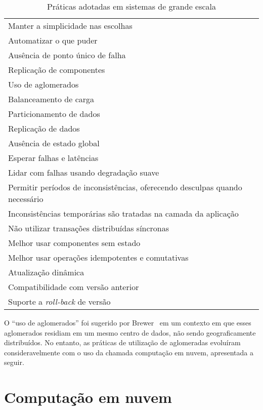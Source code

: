 \begin{table}[!t]
\begin{center}
    \begin{tabular}{l}
	 \hline
Manter a simplicidade nas escolhas \\
Automatizar o que puder \\
Ausência de ponto único de falha \\
Replicação de componentes \\
Uso de aglomerados \\
Balanceamento de carga \\
Particionamento de dados \\
Replicação de dados \\
Ausência de estado global  \\%
Esperar falhas e latências  \\
Lidar com falhas usando degradação suave \\
Permitir períodos de inconsistências, oferecendo desculpas quando necessário \\
Inconsistências temporárias são tratadas na camada da aplicação \\
Não utilizar transações distribuídas síncronas \\
Melhor usar componentes sem estado  \\%
Melhor usar operações idempotentes e comutativas \\
Atualização dinâmica \\
Compatibilidade com versão anterior \\
Suporte a \emph{roll-back} de versão \\
	 \hline
    \end{tabular}
  \caption{Práticas adotadas em sistemas de grande escala}
  \label{tab:escala}
\end{center}
\end{table}

O ``uso de aglomerados'' foi sugerido por Brewer~\cite{Brewer2001GiantScale} em um contexto em que esses aglomerados residiam em um mesmo centro de dados, não sendo geograficamente distribuídos. No entanto, as práticas de utilização de aglomeradas evoluíram consideravelmente com o uso da chamada computação em nuvem, apresentada a seguir.

\section{Computação em nuvem}

